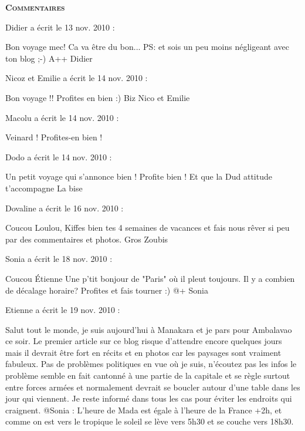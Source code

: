 \bigskip
\textbf{\textsc{Commentaires}}

\medskip
Didier a écrit le 13 nov. 2010 :
\begin{displayquote}
Bon voyage mec! Ca va être du bon...
PS: et sois un peu moins négligeant avec ton blog ;-)
A++
Didier
\end{displayquote}

\medskip
Nicoz et Emilie a écrit le 14 nov. 2010 :
\begin{displayquote}
Bon voyage !!
Profites en bien :)
Biz
Nico et Emilie
\end{displayquote}

\medskip
Macolu a écrit le 14 nov. 2010 :
\begin{displayquote}
Veinard ! Profites-en bien !
\end{displayquote}

\medskip
Dodo a écrit le 14 nov. 2010 :
\begin{displayquote}
Un petit voyage qui s'annonce bien ! Profite bien !
Et que la Dud attitude t'accompagne
La bise
\end{displayquote}

\medskip
Dovaline a écrit le 16 nov. 2010 :
\begin{displayquote}
Coucou Loulou,
Kiffes bien tes 4 semaines de vacances et fais nous rêver si peu par des commentaires et photos.
Gros Zoubis
\end{displayquote}

\medskip
Sonia a écrit le 18 nov. 2010 :
\begin{displayquote}
Coucou Étienne
Une p'tit bonjour de "Paris" où il pleut toujours.
Il y a combien de décalage horaire?
Profites et fais tourner :)
@+
Sonia
\end{displayquote}

\medskip
Etienne a écrit le 19 nov. 2010 :
\begin{displayquote}
Salut tout le monde, je suis aujourd'hui à Manakara et je pars pour Ambalavao ce soir. Le premier article sur ce blog risque d'attendre encore quelques jours mais il devrait être fort en récits et en photos car les paysages sont vraiment fabuleux. Pas de problèmes politiques en vue où je suis, n'écoutez pas les infos le problème semble en fait cantonné à une partie de la capitale et se règle surtout entre forces armées et normalement devrait se boucler autour d'une table dans les jour qui viennent. Je reste informé dans tous les cas pour éviter les endroits qui craignent.
@Sonia : L'heure de Mada est égale à l'heure de la France +2h, et comme on est vers le tropique le soleil se lève vers 5h30 et se couche vers 18h30.
\end{displayquote}
